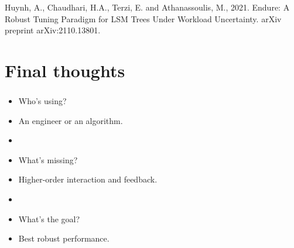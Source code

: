 \documentclass[usenames,dvipsnames, 18pt, compress, aspectratio=169]{beamer}
\begin{document}
\begin{frame}
\begin{center}
\begin{overprint}[9cm]
		\end{overprint}

    \linespread{0.5}
    \vspace{0.5cm}
    \begin{flushleft}
    \color{black}\fontsize{6pt}{0}\selectfont
        Huynh, A., Chaudhari, H.A., Terzi, E. and Athanassoulis, M., 2021.
        Endure: A Robust Tuning Paradigm for LSM Trees Under Workload
        Uncertainty. arXiv preprint arXiv:2110.13801.
    \linespread{1.5}
    \end{flushleft}

    \end{center}
\end{frame}

\section{Final thoughts}

\begin{frame}[fragile]{}
    \frametitle{}
    \begin{center}

        \begin{itemize}
            \item Who's using?
            \item           An engineer or an algorithm.
            \item
            \item What's missing?
            \item           Higher-order interaction and feedback.
            \item
            \item What's the goal?
            \item           Best robust performance.
        \end{itemize}

    \end{center}
\end{frame}
\end{document}

